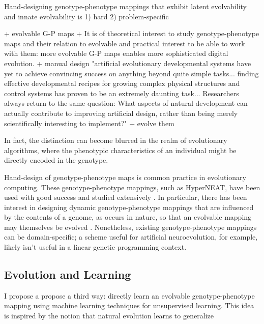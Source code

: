 Hand-designing genotype-phenotype mappings that exhibit latent evolvability and innate evolvability is
1) hard
2) problem-specific

+ evolvable G-P maps
  + It is of theoretical interest to study genotype-phenotype maps and their relation to evolvable and practical interest to be able to work with them: more evolvable G-P maps enables more sophisticated digital evolution.
  + manual design \cite[p 223]{downing2015intelligence}
  "artificial evolutionary developmental systems have yet to achieve convincing success on anything beyond quite simple tasks... finding effective developmental recipes for growing complex physical structures and control systems has proven to be an extremely daunting task... Researchers always return to the same question: What aspects of natural development can actually contribute to improving artificial design, rather than being merely scientifically interesting to implement?"
  + evolve them \cite{reisinger2007acquiring}



  In fact, the distinction can become blurred in the realm of evolutionary algorithms, where the phenotypic characteristics of an individual might be directly encoded in the genotype.


  Hand-design of genotype-phenotype maps is common practice in evolutionary computing.
  These genotype-phenotype mappings, such as HyperNEAT, have been used with good success and studied extensively \cite{stanley2009hypercube, woolley2010evolving, clune2011performance}.
  In particular, there has been interest in designing dynamic genotype-phenotype mappings that are influenced by the contents of a genome, as occurs in nature, so that an evolvable mapping may themselves be evolved \cite{reisinger2007acquiring}.
  Nonetheless, existing genotype-phenotype mappings can be domain-specific;
  a scheme useful for artificial neuroevolution, for example, likely isn't useful in a linear genetic programming context.


\subsection{Evolution and Learning}

I propose a propose a third way: directly learn an evolvable genotype-phenotype mapping using machine learning techniques for unsupervised learning.
This idea is inspired by the notion that natural evolution learns to generalize \cite{kouvaris2017evolution} \cite{watson2016can}

